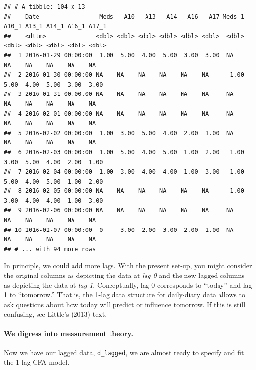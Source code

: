 \documentclass[]{article}
\let\oldparagraph\paragraph
\renewcommand{\paragraph}[1]{\oldparagraph{#1}\mbox{}}
\begin{document}
\begin{verbatim}
## # A tibble: 104 x 13
##    Date                 Meds   A10   A13   A14   A16   A17 Meds_1 A10_1 A13_1 A14_1 A16_1 A17_1
##    <dttm>              <dbl> <dbl> <dbl> <dbl> <dbl> <dbl>  <dbl> <dbl> <dbl> <dbl> <dbl> <dbl>
##  1 2016-01-29 00:00:00  1.00  5.00  4.00  5.00  3.00  3.00  NA    NA    NA    NA    NA    NA   
##  2 2016-01-30 00:00:00 NA    NA    NA    NA    NA    NA      1.00  5.00  4.00  5.00  3.00  3.00
##  3 2016-01-31 00:00:00 NA    NA    NA    NA    NA    NA     NA    NA    NA    NA    NA    NA   
##  4 2016-02-01 00:00:00 NA    NA    NA    NA    NA    NA     NA    NA    NA    NA    NA    NA   
##  5 2016-02-02 00:00:00  1.00  3.00  5.00  4.00  2.00  1.00  NA    NA    NA    NA    NA    NA   
##  6 2016-02-03 00:00:00  1.00  5.00  4.00  5.00  1.00  2.00   1.00  3.00  5.00  4.00  2.00  1.00
##  7 2016-02-04 00:00:00  1.00  3.00  4.00  4.00  1.00  3.00   1.00  5.00  4.00  5.00  1.00  2.00
##  8 2016-02-05 00:00:00 NA    NA    NA    NA    NA    NA      1.00  3.00  4.00  4.00  1.00  3.00
##  9 2016-02-06 00:00:00 NA    NA    NA    NA    NA    NA     NA    NA    NA    NA    NA    NA   
## 10 2016-02-07 00:00:00  0     3.00  2.00  3.00  2.00  1.00  NA    NA    NA    NA    NA    NA   
## # ... with 94 more rows
\end{verbatim}

In principle, we could add more lags. With the present set-up, you might
consider the original columns as depicting the data at \emph{lag 0} and
the new lagged columns as depicting the data at \emph{lag 1}.
Conceptually, lag 0 corresponds to ``today'' and lag 1 to ``tomorrow.''
That is, the 1-lag data structure for daily-diary data allows to ask
questions about how today will predict or influence tomorrow. If this is
still confusing, see Little's (2013) text.

\paragraph{We digress into measurement
theory.}\label{we-digress-into-measurement-theory.}

Now we have our lagged data, \texttt{d\_lagged}, we are almost ready to
specify and fit the 1-lag CFA model.
\end{document}
